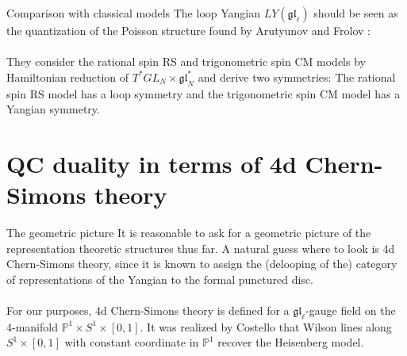 \documentclass[11pt]{beamer}
\theoremstyle{remark}
\theoremstyle{remark}
\renewcommand{\P}{\mathbb{P}}
\begin{document}
\begin{frame}{Comparison with classical models}
The loop Yangian $LY(\mathfrak{gl}_\ell)$ should be seen as the quantization of the Poisson structure found by Arutyunov and Frolov \cite{article:arutyunov:1998}:
\\~\\
They consider the rational spin RS and trigonometric spin CM models by Hamiltonian reduction of $T^* GL_N \times \mathfrak{gl}_N^*$ and derive two symmetries: The rational spin RS model has a loop symmetry and the trigonometric spin CM model has a Yangian symmetry.
\end{frame}

\section{QC duality in terms of 4d Chern-Simons theory}

\begin{frame}{The geometric picture}
It is reasonable to ask for a geometric picture of the representation theoretic structures thus far. A natural guess where to look is 4d Chern-Simons theory, since it is known to assign the (delooping of the) category of representations of the Yangian to the formal punctured disc.
\\~\\
For our purposes, 4d Chern-Simons theory is defined for a $\mathfrak{gl}_\ell$-gauge field on the 4-manifold $\P^1 \times S^1 \times [0,1]$. It was realized by Costello \cite{article:costello:2013} that Wilson lines along $S^1 \times [0,1]$ with constant coordinate in $\P^1$ recover the Heisenberg model.
\end{frame}
\end{document}

